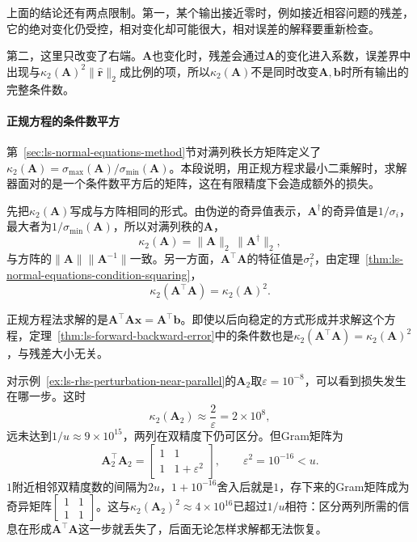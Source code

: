 上面的结论还有两点限制。第一，某个输出接近零时，例如接近相容问题的残差，它的绝对变化仍受控，相对变化却可能很大，相对误差的解释要重新检查。

第二，这里只改变了右端。$\bm A$也变化时，残差会通过$\bm A$的变化进入系数，误差界中出现与$\kappa_2(\bm A)^2\lVert\hat{\bm r}\rVert_2$成比例的项，所以$\kappa_2(\bm A)$不是同时改变$\bm A,\bm b$时所有输出的完整条件数。

\paragraph{正规方程的条件数平方}
第~\ref{sec:ls-normal-equations-method}节对满列秩长方矩阵定义了$\kappa_2(\bm A)=\sigma_{\max}(\bm A)/\sigma_{\min}(\bm A)$。本段说明，用正规方程求最小二乘解时，求解器面对的是一个条件数平方后的矩阵，这在有限精度下会造成额外的损失。

先把$\kappa_2(\bm A)$写成与方阵相同的形式。由伪逆的奇异值表示，$\bm A^\dagger$的奇异值是$1/\sigma_i$，最大者为$1/\sigma_{\min}(\bm A)$，所以对满列秩的$\bm A$，
\begin{equation}
 \kappa_2(\bm A)=\lVert\bm A\rVert_2\,\lVert\bm A^\dagger\rVert_2 ,
 \label{eq:ls-rectangular-condition-number}
\end{equation}
与方阵的$\lVert\bm A\rVert\lVert\bm A^{-1}\rVert$一致。另一方面，$\bm A^\top\bm A$的特征值是$\sigma_i^2$，由定理~\ref{thm:ls-normal-equations-condition-squaring}，
\begin{equation}
 \kappa_2(\bm A^\top\bm A)=\kappa_2(\bm A)^2 .
 \label{eq:matrix-analysis-normal-equation-condition-square}
\end{equation}

正规方程法求解的是$\bm A^\top\bm A\bm x=\bm A^\top\bm b$。即使以后向稳定的方式形成并求解这个方程，定理~\ref{thm:ls-forward-backward-error}中的条件数也是$\kappa_2(\bm A^\top\bm A)=\kappa_2(\bm A)^2$，与残差大小无关。

对示例~\ref{ex:ls-rhs-perturbation-near-parallel}的$\bm A_2$取$\varepsilon=10^{-8}$，可以看到损失发生在哪一步。这时
\[
 \kappa_2(\bm A_2)\approx\frac2\varepsilon=2\times10^8,
\]
远未达到$1/u\approx9\times10^{15}$，两列在双精度下仍可区分。但Gram矩阵为
\[
 \bm A_2^\top\bm A_2=\begin{bmatrix}1&1\\1&1+\varepsilon^2\end{bmatrix},\qquad \varepsilon^2=10^{-16}<u .
\]
$1$附近相邻双精度数的间隔为$2u$，$1+10^{-16}$舍入后就是$1$，存下来的Gram矩阵成为奇异矩阵$\left[\begin{smallmatrix}1&1\\1&1\end{smallmatrix}\right]$。这与$\kappa_2(\bm A_2)^2\approx4\times10^{16}$已超过$1/u$相符：区分两列所需的信息在形成$\bm A^\top\bm A$这一步就丢失了，后面无论怎样求解都无法恢复。

